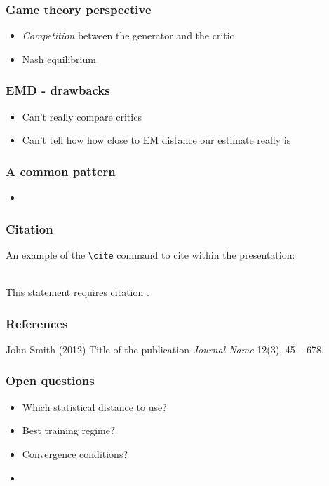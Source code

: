 \documentclass{beamer}
\begin{document}
\begin{frame}
	\frametitle{Game theory perspective}
	\begin{itemize}
		\item \textit{Competition} between the generator and the critic
		\item Nash equilibrium
	\end{itemize}
\end{frame}

\begin{frame}
	\frametitle{EMD - drawbacks}
	\begin{itemize}
		\item Can't really compare critics
		\item Can't tell how how close to EM distance our estimate really is
	\end{itemize}
\end{frame}

\begin{frame}
	\frametitle{A common pattern}
	\begin{itemize}
		\item
	\end{itemize}
\end{frame}

\begin{frame}[fragile] %
\frametitle{Citation}
An example of the \verb|\cite| command to cite within the presentation:\\~

This statement requires citation \cite{p1}.
\end{frame}


\begin{frame}
\frametitle{References}
\footnotesize{
\begin{thebibliography}{99} %
 John Smith (2012)
\newblock Title of the publication
\newblock \emph{Journal Name} 12(3), 45 -- 678.
\end{thebibliography}
}
\end{frame}
\begin{frame}
	\frametitle{Open questions}
	\begin{itemize}
		\item Which statistical distance to use?
		\item Best training regime?
		\item Convergence conditions?
		\item 
	\end{itemize}
\end{frame}
\end{document}
